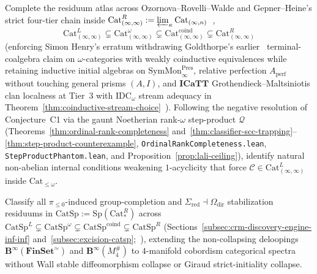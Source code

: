 \begin{problem}\label{prob:open-11}
Complete the residuum atlas across Ozornova--Rovelli--Walde and Gepner--Heine's strict four-tier chain inside $\mathrm{Cat}^R_{(\infty, \infty)} := \varprojlim_\kappa \mathrm{Cat}_{(\infty, n)}$~\cite{ORW26,GepnerHeine26},
\[
  \mathrm{Cat}^L_{(\infty, \infty)} \subsetneq \mathrm{Cat}^\omega_{(\infty, \infty)} \subsetneq \mathrm{Cat}^{\mathrm{coind}}_{(\infty, \infty)} \subsetneq \mathrm{Cat}^R_{(\infty, \infty)}
\]
(enforcing Simon Henry's erratum withdrawing Goldthorpe's earlier~\cite{Goldthorpe23} terminal-coalgebra claim on $\omega$-categories with weakly coinductive equivalences while retaining inductive initial algebras on $\mathrm{SymMon}^{\mathrm{Pres}}_\infty$, relative perfection $A_{\mathrm{perf}}$~\cite{Joyal85,BhattScholze22} without touching general prisms $(A, I)$, and $\mathbf{ICaTT}$ Grothendieck--Maltsiniotis clan localness at Tier~3 with $\mathrm{IDC}_\omega$ stream adequacy in Theorem~\ref{thm:coinductive-stream-choice}~\cite{BCM26,FinsterMimram17}). Following the negative resolution of Conjecture~C1 via the gaunt Noetherian rank-$\omega$ step-product $\mathcal{Q}$ (Theorems~\ref{thm:ordinal-rank-completeness} and~\ref{thm:classifier-scc-trapping}--\ref{thm:step-product-counterexample}, \texttt{OrdinalRankCompleteness.lean}, \texttt{StepProductPhantom.lean}, and Proposition~\ref{prop:lali-ceiling}), identify natural non-abelian internal conditions weakening $1$-acyclicity that force $\mathcal{C} \in \mathrm{Cat}^L_{(\infty, \infty)}$ inside $\mathrm{Cat}_{\le \omega}$.
\end{problem}

\begin{problem}\label{prob:open-12}
Classify all $\pi_{\le 0}$-induced group-completion and $\Sigma_{\mathrm{red}} \dashv \Omega_{\mathrm{dir}}$ stabilization residuums in $\mathrm{CatSp} := \mathrm{Sp}(\mathrm{Cat}^R_*)$ across $\mathrm{CatSp}^L \subsetneq \mathrm{CatSp}^\omega \subsetneq \mathrm{CatSp}^{\mathrm{coind}} \subsetneq \mathrm{CatSp}^R$ (Sections~\ref{subsec:crm-discovery-engine-inf-inf} and~\ref{subsec:excision-catsp};~\cite{Masuda26,Heine26,Geiss26}), extending the non-collapsing deloopings $\mathbf{B}^\infty(\mathbf{FinSet}^{\simeq})$ and $\mathbf{B}^\infty(M_4^\#)$ to $4$-manifold cobordism categorical spectra without Wall stable diffeomorphism collapse or Giraud strict-initiality collapse.
\end{problem}

